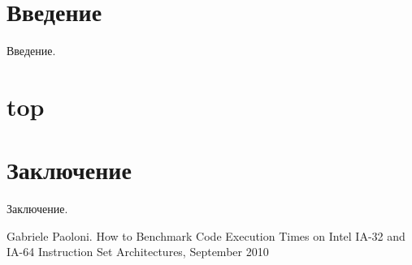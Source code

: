 \documentclass[12pt, a4paper, utf8]{article}
\begin{document}
\tableofcontents

\newpage

\section*{Введение}

Введение.

\section{top}

\section*{Заключение}

Заключение.


\newpage
\begin{thebibliography}{99}

	 Gabriele Paoloni. How to Benchmark Code Execution Times on Intel IA-32 and IA-64 Instruction Set Architectures, September 2010


\end{thebibliography}

\newpage
{}
\listoffigures

\newpage
{}
\listoftables

%
\end{document}
